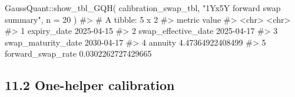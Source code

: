 \documentclass[
  letterpaper,
  DIV=11,
  numbers=noendperiod]{scrreprt}
\newenvironment{Shaded}{\begin{snugshade}}{\end{snugshade}}
\newcommand{\AttributeTok}[1]{\textcolor[rgb]{0.40,0.45,0.13}{#1}}
\newcommand{\CommentTok}[1]{\textcolor[rgb]{0.37,0.37,0.37}{#1}}
\newcommand{\DecValTok}[1]{\textcolor[rgb]{0.68,0.00,0.00}{#1}}
\newcommand{\FunctionTok}[1]{\textcolor[rgb]{0.28,0.35,0.67}{#1}}
\newcommand{\NormalTok}[1]{\textcolor[rgb]{0.00,0.23,0.31}{#1}}
\newcommand{\SpecialCharTok}[1]{\textcolor[rgb]{0.37,0.37,0.37}{#1}}
\newcommand{\StringTok}[1]{\textcolor[rgb]{0.13,0.47,0.30}{#1}}
\begin{document}
\begin{Shaded}
\begin{Highlighting}[]
\NormalTok{GaussQuant}\SpecialCharTok{::}\FunctionTok{show\_tbl\_GQH}\NormalTok{(}
\NormalTok{  calibration\_swap\_tbl,}
  \StringTok{"1Yx5Y forward swap summary"}\NormalTok{,}
  \AttributeTok{n =} \DecValTok{20}
\NormalTok{)}
\CommentTok{\#\textgreater{} \# A tibble: 5 x 2}
\CommentTok{\#\textgreater{}   metric              value             }
\CommentTok{\#\textgreater{}   \textless{}chr\textgreater{}               \textless{}chr\textgreater{}             }
\CommentTok{\#\textgreater{} 1 expiry\_date         2025{-}04{-}15        }
\CommentTok{\#\textgreater{} 2 swap\_effective\_date 2025{-}04{-}17        }
\CommentTok{\#\textgreater{} 3 swap\_maturity\_date  2030{-}04{-}17        }
\CommentTok{\#\textgreater{} 4 annuity             4.47364922408499  }
\CommentTok{\#\textgreater{} 5 forward\_swap\_rate   0.0302262727429665}
\end{Highlighting}
\end{Shaded}

\subsection{11.2 One-helper calibration}\label{one-helper-calibration}
\end{document}
